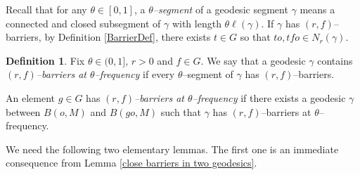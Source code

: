 \documentclass{amsart}
\theoremstyle{definition}
\newtheorem{defn}[thm]{Definition}
\theoremstyle{remark}
\begin{document}
Recall that for any $\theta\in [0,1]$, a \textit{$\theta$--segment} of a geodesic segment $\gamma$ means   a connected and {closed} subsegment of $\gamma$ with length $\theta \ell(\gamma)$. If $\gamma$ has $(r, f)$--barriers, by Definition \ref{BarrierDef}, there exists $t\in G$ so that $to, tfo\in N_r(\gamma).$



\begin{defn}\label{FreqBarrierDefn}
Fix $\theta\in (0,1]$, $r>0$ and $f\in G$. We say that    a geodesic $\gamma$ contains \textit{$(r, f)$--barriers at $\theta$--frequency} if 
  every $\theta$--segment of $\gamma$ has $(r, f)$--barriers. 


An element $g\in G$ has \textit{$(r, f)$--barriers at $\theta$--frequency} if there exists a geodesic $\gamma$ between $B(o, M)$ and $B(go, M)$ such that $\gamma$ has  $(r, f)$--barriers at $\theta$--frequency.
\end{defn}

 

 


We need the following two elementary lemmas. The first one is an immediate consequence  from Lemma \ref{close barriers in two geodesics}.
\end{document}
